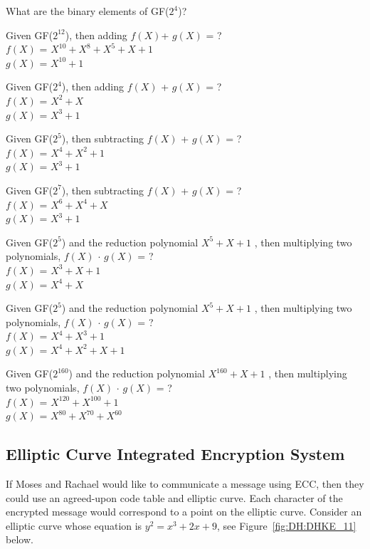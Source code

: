 \begin{exer}
What are the binary elements of GF($2^4$)?
\end{exer}
\begin{exer}
Given GF($2^{12}$), then adding $f(X)$+ $g(X)$ = ?
        \\ $f(X)$ = $X^{10} + X^8 + X^5 + X + 1$
        \\ $g(X)$ = $X^{10} + 1$
\end{exer}
\begin{exer}
Given GF($2^4$), then adding $f(X)$ + $g(X)$ = ?
        \\ $f(X)$ = $X^{2} + X $
        \\ $g(X)$ = $X^{3} + 1$
\end{exer}
\begin{exer}
Given GF($2^5$), then subtracting $f(X)$ + $g(X)$ = ?
        \\ $f(X)$ = $X^{4} + X^2 + 1 $
        \\ $g(X)$ = $X^{3} + 1$
\end{exer}
\begin{exer}
Given GF($2^7$), then subtracting $f(X)$ + $g(X)$ = ?
        \\ $f(X)$ = $X^{6} + X^4 + X $
        \\ $g(X)$ = $X^{3} + 1$
\end{exer}
\begin{exer}
Given GF($2^5$) and the reduction polynomial $X^5 + X + 1$ , then multiplying two polynomials, $f(X)$ $\cdot$ $g(X)$ = ?
        \\ $f(X)$ = $X^{3} + X + 1 $
        \\ $g(X)$ = $X^{4} + X$
\end{exer}
\begin{exer}
Given GF($2^5$) and the reduction polynomial $X^5 + X + 1$ , then multiplying two polynomials, $f(X)$ $\cdot$ $g(X)$ = ?
        \\ $f(X)$ = $X^{4} + X^3 + 1 $
        \\ $g(X)$ = $X^{4} + X^2 + X + 1$
\end{exer}
\begin{exer}
Given GF($2^{160}$) and the reduction polynomial $X^{160} + X + 1$ , then multiplying two polynomials, $f(X)$ $\cdot$ $g(X)$ = ?
        \\ $f(X)$ = $X^{120} + X^{100} + 1 $
        \\ $g(X)$ = $X^{80} + X^{70} + X^{60}$
\end{exer}

\subsection{Elliptic Curve Integrated Encryption System} 
If Moses and Rachael would like to communicate a message using ECC, then they could use an agreed-upon code table and elliptic curve.  Each character of the encrypted message would correspond to a point on the elliptic curve. Consider an elliptic curve whose equation is $y^2 = x^3 + 2x + 9$, see Figure~\ref{fig:DH:DHKE_11} below.

